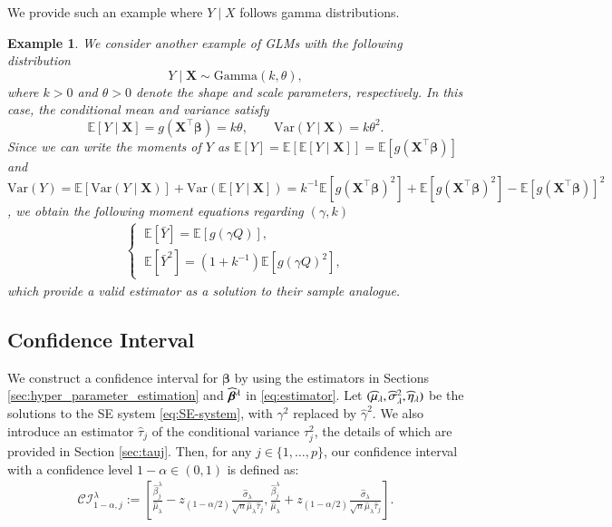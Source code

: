 \documentclass[12pt,reqno]{amsart}
\newtheorem{example}{Example}%
\newcommand{\sbr}[1]{\left[#1\right]}
\newcommand{\E}{\mathbb{E}}
\newcommand{\cc}{\color{black}}
\newcommand{\ccc}{\color{black}}
\newcommand{\mc}{\color{black}}
\renewcommand{\hat}{\widehat}
\def\bbeta{\bm{\beta}}
\begin{document}
{\cc We provide such an example where $Y\mid X$ follows gamma distributions.
\begin{example}
    We consider another example of GLMs with the following distribution
\[
Y \mid \bm{X} \sim \mathrm{Gamma}(k,\theta),
\]
where $k>0$ and $\theta>0$ denote the shape and scale parameters, respectively. In this case, the conditional mean and variance satisfy
\[
\mathbb{E}[Y \mid \bm{X}] = g(\bm{X}^\top \bm{\beta}) = k\theta,
\qquad
\mathrm{Var}(Y \mid \bm{X}) = k\theta^{2}.
\]
Since we can write the moments of $Y$ as $\E[ Y]=\E[\mathbb{E}[Y \mid \bm{X}]]=\E[g(\bm{X}^\top \bm{\beta})]$ and $\mathrm{Var}( Y)=\E[\mathrm{Var}(Y \mid \bm{X})]+\mathrm{Var}(\E[Y \mid \bm{X}]) =k^{-1}\E[g(\bm{X}^\top \bm{\beta})^2]+\E[g(\bm{X}^\top \bm{\beta})^2]-\E[g(\bm{X}^\top \bm{\beta})]^2$, 
we obtain the following moment equations regarding $(\gamma,k)$
\begin{align*}
    \begin{cases}
    \ \E[\bar Y] = \E[g(\gamma Q)],\\
    \ \E[\bar{Y}^2] = \left(1+k^{-1}\right)\E[g(\gamma Q)^2],
    \end{cases}
\end{align*}
which provide a valid estimator as a solution to their sample analogue.
\end{example}
}

\subsection{Confidence Interval} \label{sec:theory_CI}

We construct a confidence interval for $\bbeta$ by using the estimators in Sections \ref{sec:hyper_parameter_estimation} and $\hat{\bbeta}^{\ccc\lambda}$ in \eqref{eq:estimator}.
Let $(\hat{\mu}_{\ccc\lambda},\hat{\sigma}_{\lambda}^2,\hat\eta_{\ccc\lambda})$ be the solutions to the SE system \eqref{eq:SE-system}, with $\gamma^2$ replaced by $\hat{\gamma}^2$. 
We also introduce an estimator $\hat{\tau}_j$ of the conditional variance $\tau_j^2$, the details of which are provided in Section \ref{sec:tauj}.
Then, for any $j\in\{1,\dots,p\}$, our confidence interval with a confidence level $1-\alpha \in (0,1)$ is defined as:
\begin{align}
\label{eq:correct-CI}
    \mathcal{CI}_{{1-\alpha},j}^\lambda := \sbr{\frac{\hat{\beta}_j^\lambda}{\hat{\mu}_\lambda}-z_{(1-\alpha/2)}\frac{\hat{\sigma}_\lambda}{\sqrt{n}\hat{\mu}_\lambda\hat{\tau}_j}, \frac{\hat{\beta}_j^\lambda}{\hat{\mu}_\lambda}+z_{(1-\alpha/2)}\frac{\hat{\sigma}_\lambda}{\sqrt{n}\hat{\mu}_\lambda\hat{\tau}_j}}.
\end{align}
\end{document}
